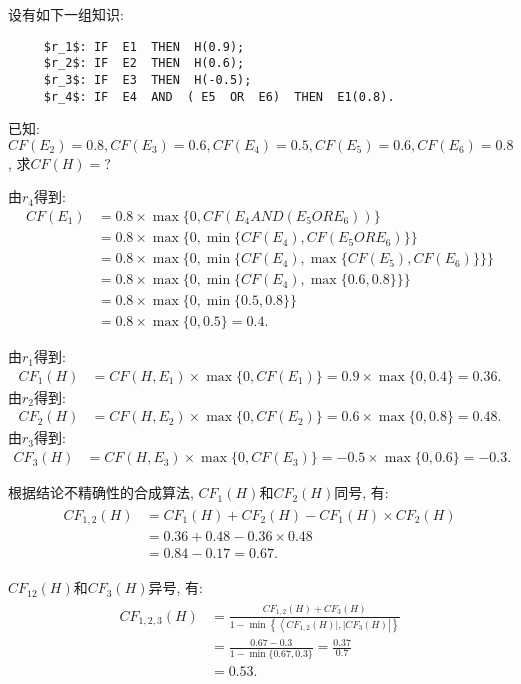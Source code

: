 \begin{example}
设有如下一组知识:
\begin{Verbatim}
     $r_1$: IF  E1  THEN  H(0.9);
     $r_2$: IF  E2  THEN  H(0.6);
     $r_3$: IF  E3  THEN  H(-0.5);
     $r_4$: IF  E4  AND  ( E5  OR  E6)  THEN  E1(0.8).
\end{Verbatim}
已知: $CF(E_2)=0.8, CF(E_3)=0.6, CF(E_4)=0.5, CF(E_5)=0.6, CF(E_6)=0.8$, 求$CF(H)=?$
\vspace{-0.2cm}
\end{example}
\begin{result}
由$r_4$得到:
\begin{align*}
    CF(E_1)&=0.8\times \max\{ 0, CF(E_4  AND  (E_5  OR   E_6)) \}\\
          &=0.8\times \max\{ 0, \min\{CF(E_4),  CF(E_5  OR   E_6)\} \}\\
          &=0.8\times \max\{ 0, \min\{CF(E_4),  \max\{CF(E_5),  CF(E_6)\}\} \}\\
          &=0.8\times \max\{ 0, \min\{CF(E_4),  \max\{0.6,  0.8\}\} \}\\
          &=0.8\times \max\{ 0, \min\{0.5,  0.8\} \}\\
          &=0.8\times \max\{ 0,  0.5 \} = 0.4.
\end{align*}
\end{result}
由$r_1$得到:
\begin{align*}
CF_1(H)&=CF(H, E_1)\times \max\{0,  CF(E_1)\}=0.9\times \max\{0,  0.4\} = 0.36.
\end{align*}
    由$r_2$得到:
\begin{align*}
CF_2(H)&=CF(H, E_2)\times \max\{0,  CF(E_2)\}=0.6\times \max\{0,  0.8\} = 0.48.
\end{align*}
由$r_3$得到:
\begin{align*}
CF_3(H)&=CF(H, E_3)\times \max\{0,  CF(E_3)\}=-0.5\times \max\{0,  0.6\} = -0.3.
\end{align*}

根据结论不精确性的合成算法, $CF_1(H)$和$CF_2(H)$同号, 有:
\begin{align}
  \begin{aligned}
  C F_{1,2}(H) &=C F_{1}(H)+C F_{2}(H)-C F_{1}(H) \times C F_{2}(H) \\
  &=0.36+0.48-0.36 \times 0.48 \\
  &=0.84-0.17=0.67.
  \end{aligned}
\end{align}

$CF_{12}(H)$和$CF_3(H)$异号, 有:
\begin{align}
  \begin{aligned}
  C F_{1,2,3}(H) &=\frac{C F_{1,2}(H)+C F_{3}(H)}{1-\min \left\{\left\langle C F_{1,2}(H)|,| C F_{3}(H)\right|\right\}} \\
  &=\frac{0.67-0.3}{1-\min\{0.67,0.3\}}=\frac{0.37}{0.7} \\
  &=0.53.
  \end{aligned}
\end{align}
